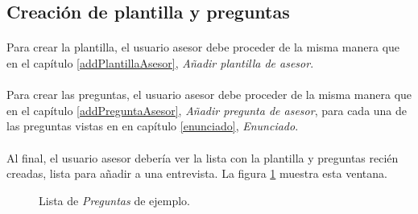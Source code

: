   \subsection{Creación de plantilla y preguntas}

  \paragraph{}Para crear la plantilla, el usuario asesor debe proceder de la
  misma manera que en el capítulo \ref{addPlantillaAsesor},
  \textit{Añadir plantilla de asesor}.

  \paragraph{}Para crear las preguntas, el usuario asesor debe proceder de la
  misma manera que en el capítulo \ref{addPreguntaAsesor},
  \textit{Añadir pregunta de asesor}, para cada una de las preguntas vistas en
  en capítulo \ref{enunciado}, \textit{Enunciado}.

  \paragraph{}Al final, el usuario asesor debería ver la lista con la plantilla
  y preguntas recién creadas, lista para añadir a una entrevista. La figura
  \ref{ejemploListaPreguntas} muestra esta ventana.

  \begin{figure}[!ht]
    \begin{center}
      \caption{Lista de \textit{Preguntas} de ejemplo.}
      \label{ejemploListaPreguntas}
    \end{center}
  \end{figure}

